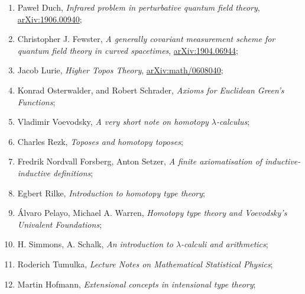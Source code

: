 \documentclass[a4paper,11pt]{article}
\begin{document}
\begin{enumerate}
\item Paweł Duch, \textit{Infrared problem in perturbative quantum
    field theory},
  \href{https://arxiv.org/abs/1906.00940}{arXiv:1906.00940};



\item Christopher J. Fewster, \textit{A generally covariant
    measurement scheme for quantum field theory in curved spacetimes},
  \href{https://arxiv.org/abs/1904.06944v1}{arXiv:1904.06944};



\item Jacob Lurie, \textit{Higher Topos Theory},
  \href{https://arxiv.org/abs/math/0608040v4}{arXiv:math/0608040};



\item Konrad Osterwalder, and Robert Schrader, \textit{Axioms for
    Euclidean Green's Functions};



\item Vladimir Voevodsky, \textit{A very short note on homotopy
    $\lambda$-calculus};



\item Charles Rezk, \textit{Toposes and homotopy toposes};



\item Fredrik Nordvall Forsberg, Anton Setzer, \textit{A finite
    axiomatisation of inductive-inductive definitions};



\item Egbert Rilke, \textit{Introduction to homotopy type theory};



\item \'{A}lvaro Pelayo, Michael A. Warren, \textit{Homotopy type
    theory and Voevodsky’s Univalent Foundations};



\item H. Simmons, A. Schalk, \textit{An introduction to
    $\lambda$-calculi and arithmetics};



\item Roderich Tumulka, \textit{Lecture Notes on Mathematical
    Statistical Physics};



\item Martin Hofmann, \textit{Extensional concepts in intensional type
    theory};




\end{enumerate}
\end{document}
